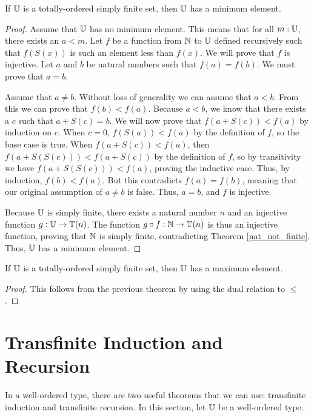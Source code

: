 \documentclass[../math.tex]{subfiles}
\begin{document}
\begin{theorem} \label{simple_finite_min}
    If $\mathbb{U}$ is a totally-ordered simply finite set, then $\mathbb{U}$ has a minimum
    element.
\end{theorem}
\begin{proof}
    Assume that $\mathbb{U}$ has no minimum element.  This means that for all $m : \mathbb{U}$,
    there exists an $a < m$.  Let $f$ be a function from $\mathbb{N}$ to $\mathbb{U}$ defined
    recursively such that $f(S(x))$ is such an element less than $f(x)$.  We
    will prove that $f$ is injective.  Let $a$ and $b$ be natural numbers such
    that $f(a) = f(b)$.  We must prove that $a = b$.

    Assume that $a \neq b$.  Without loss of generality we can assume that $a <
    b$.  From this we can prove that $f(b) < f(a)$.  Because $a < b$, we know
    that there exists a $c$ such that $a + S(c) = b$.  We will now prove that
    $f(a + S(c)) < f(a)$ by induction on $c$.  When $c = 0$, $f(S(a)) < f(a)$ by
    the definition of $f$, so the base case is true.  When $f(a + S(c)) < f(a)$,
    then $f(a + S(S(c))) < f(a + S(c))$ by the definition of $f$, so by
    transitivity we have $f(a + S(S(c))) < f(a)$, proving the inductive case.
    Thus, by induction, $f(b) < f(a)$.  But this contradicts $f(a) = f(b)$,
    meaning that our original assumption of $a \neq b$ is false.  Thus, $a = b$,
    and $f$ is injective.

    Because $\mathbb{U}$ is simply finite, there exists a natural number $n$ and an
    injective function $g : \mathbb{U} \to \mathbb{T}(n)$.  The function $g \circ f : \mathbb{N} \to
    \mathbb{T}(n)$ is thus an injective function, proving that $\mathbb{N}$ is simply finite,
    contradicting Theorem \ref{nat_not_finite}.  Thus, $\mathbb{U}$ has a minimum
    element.
\end{proof}

\begin{theorem} \label{simple_finite_max}
    If $\mathbb{U}$ is a totally-ordered simply finite set, then $\mathbb{U}$ has a maximum
    element.
\end{theorem}
\begin{proof}
    This follows from the previous theorem by using the dual relation to $\leq$.
\end{proof}

\section{Transfinite Induction and Recursion}

In a well-ordered type, there are two useful theorems that we can use:
transfinite induction and transfinite recursion.  In this section, let $\mathbb{U}$ be a
well-ordered type.
\end{document}
